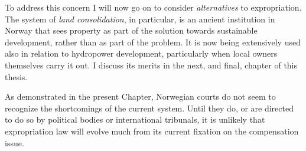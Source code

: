 To address this concern I will now go on to consider {\it alternatives} to expropriation. The system of {\it land consolidation}, in particular, is an ancient institution in Norway that sees property as part of the solution towards sustainable development, rather than as part of the problem. It is now being extensively used also in relation to hydropower development, particularly when local owners themselves carry it out. I discuss its merits in the next, and final, chapter of this thesis.

As demonstrated in the present Chapter, Norwegian courts do not seem to recognize the shortcomings of the current system. Until they do, or are directed to do so by political bodies or international tribunals, it is unlikely that expropriation law will evolve much from its current fixation on the compensation issue. 


